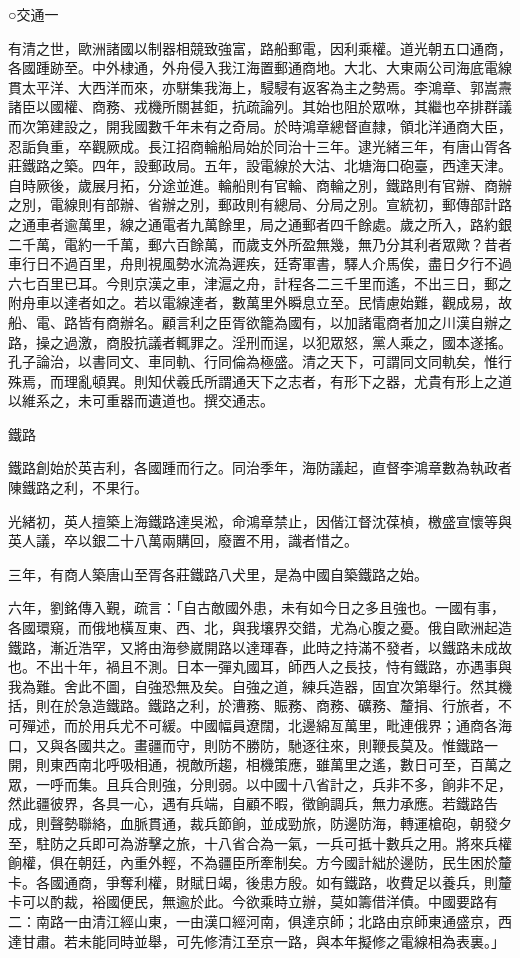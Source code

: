 
\begin{pinyinscope}
○交通一

有清之世，歐洲諸國以制器相競致強富，路船郵電，因利乘權。道光朝五口通商，各國踵跡至。中外棣通，外舟侵入我江海置郵通商地。大北、大東兩公司海底電線貫太平洋、大西洋而來，亦駢集我海上，駸駸有返客為主之勢焉。李鴻章、郭嵩燾諸臣以國權、商務、戎機所關甚鉅，抗疏論列。其始也阻於眾咻，其繼也卒排群議而次第建設之，開我國數千年未有之奇局。於時鴻章總督直隸，領北洋通商大臣，忍詬負重，卒觀厥成。長江招商輪船局始於同治十三年。逮光緒三年，有唐山胥各莊鐵路之築。四年，設郵政局。五年，設電線於大沽、北塘海口砲臺，西達天津。自時厥後，歲展月拓，分途並進。輪船則有官輪、商輪之別，鐵路則有官辦、商辦之別，電線則有部辦、省辦之別，郵政則有總局、分局之別。宣統初，郵傳部計路之通車者逾萬里，線之通電者九萬餘里，局之通郵者四千餘處。歲之所入，路約銀二千萬，電約一千萬，郵六百餘萬，而歲支外所盈無幾，無乃分其利者眾歟？昔者車行日不過百里，舟則視風勢水流為遲疾，廷寄軍書，驛人介馬俟，盡日夕行不過六七百里已耳。今則京漢之車，津滬之舟，計程各二三千里而遙，不出三日，郵之附舟車以達者如之。若以電線達者，數萬里外瞬息立至。民情慮始難，觀成易，故船、電、路皆有商辦名。顧言利之臣胥欲籠為國有，以加諸電商者加之川漢自辦之路，操之過激，商股抗議者輒罪之。淫刑而逞，以犯眾怒，黨人乘之，國本遂搖。孔子論治，以書同文、車同軌、行同倫為極盛。清之天下，可謂同文同軌矣，惟行殊焉，而理亂頓異。則知伏羲氏所謂通天下之志者，有形下之器，尤貴有形上之道以維系之，未可重器而遺道也。撰交通志。

鐵路

鐵路創始於英吉利，各國踵而行之。同治季年，海防議起，直督李鴻章數為執政者陳鐵路之利，不果行。

光緒初，英人擅築上海鐵路達吳淞，命鴻章禁止，因偕江督沈葆楨，檄盛宣懷等與英人議，卒以銀二十八萬兩購回，廢置不用，識者惜之。

三年，有商人築唐山至胥各莊鐵路八犬里，是為中國自築鐵路之始。

六年，劉銘傳入覲，疏言：「自古敵國外患，未有如今日之多且強也。一國有事，各國環窺，而俄地橫亙東、西、北，與我壤界交錯，尤為心腹之憂。俄自歐洲起造鐵路，漸近浩罕，又將由海參崴開路以達琿春，此時之持滿不發者，以鐵路未成故也。不出十年，禍且不測。日本一彈丸國耳，師西人之長技，恃有鐵路，亦遇事與我為難。舍此不圖，自強恐無及矣。自強之道，練兵造器，固宜次第舉行。然其機括，則在於急造鐵路。鐵路之利，於漕務、賑務、商務、礦務、釐捐、行旅者，不可殫述，而於用兵尤不可緩。中國幅員遼闊，北邊綿亙萬里，毗連俄界；通商各海口，又與各國共之。畫疆而守，則防不勝防，馳逐往來，則鞭長莫及。惟鐵路一開，則東西南北呼吸相通，視敵所趨，相機策應，雖萬里之遙，數日可至，百萬之眾，一呼而集。且兵合則強，分則弱。以中國十八省計之，兵非不多，餉非不足，然此疆彼界，各具一心，遇有兵端，自顧不暇，徵餉調兵，無力承應。若鐵路告成，則聲勢聯絡，血脈貫通，裁兵節餉，並成勁旅，防邊防海，轉運槍砲，朝發夕至，駐防之兵即可為游擊之旅，十八省合為一氣，一兵可抵十數兵之用。將來兵權餉權，俱在朝廷，內重外輕，不為疆臣所牽制矣。方今國計絀於邊防，民生困於釐卡。各國通商，爭奪利權，財賦日竭，後患方殷。如有鐵路，收費足以養兵，則釐卡可以酌裁，裕國便民，無逾於此。今欲乘時立辦，莫如籌借洋債。中國要路有二：南路一由清江經山東，一由漢口經河南，俱達京師；北路由京師東通盛京，西達甘肅。若未能同時並舉，可先修清江至京一路，與本年擬修之電線相為表裏。」


\end{pinyinscope}
